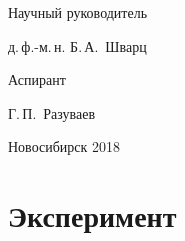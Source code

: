 \documentclass[14pt,a4paper]{extarticle}
\begin{document}
\begin{titlepage}
\vspace{1cm}

\begin{minipage}[t]{0.5\textwidth}
Научный руководитель
\end{minipage}
\begin{minipage}[t]{0.5\textwidth}
\underline{\hspace{3cm}} д.\,ф.-м.\,н. Б.\,А.~Шварц
\end{minipage}

\vspace{1cm}

\begin{minipage}[t]{0.5\textwidth}
Аспирант
\end{minipage}
\begin{minipage}[t]{0.5\textwidth}
\underline{\hspace{3cm}} Г.\,П.~Разуваев
\end{minipage}

\vfill

\begin{center}
    Новосибирск 2018
\end{center}

\end{titlepage}

\newpage

\tableofcontents

\newpage


\newpage
\section{Эксперимент}



\newpage


\newpage


\newpage




\newpage
% 
\printbibliography

% 
\end{document}
